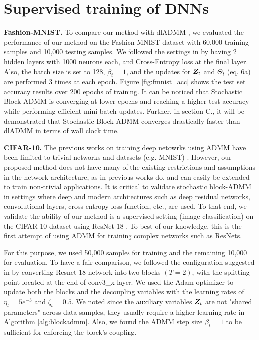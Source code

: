 \section{Supervised training of DNNs}\label{sec:sup_train}

\textbf{Fashion-MNIST.}
To compare our method with dlADMM \cite{wang2019admm}, we evaluated the performance of our method on the Fashion-MNIST dataset \cite{xiao2017/online} with 60,000 training samples and 10,000 testing samples. We followed the settings in \cite{wang2019admm} by having 2 hidden layers with 1000 neurons each, and Cross-Entropy loss at the final layer. Also, the batch size is set to 128, $\beta_t = 1$, and the updates for ${\bm{Z}}_t$ and $\Theta_t$ (eq. 6a) are performed 3 times at each epoch. Figure \ref{fig:fmnist_acc} shows the test set accuracy results over 200 epochs of training. It can be noticed that Stochastic Block ADMM is converging at lower epochs and reaching a higher test accuracy while performing efficient mini-batch updates. Further, in section C., it will be demonstrated that Stochastic Block ADMM converges drastically faster than dlADMM in terms of wall clock time.



\textbf{CIFAR-10.}
The previous works on training deep netowrks using ADMM have been limited to trivial networks and datasets (e.g. MNIST) \cite{taylor2016training,wang2019admm}. However, our proposed method does not have many of the existing restrictions and assumptions in the network architecture, as in previous works do, and can easily be extended to train non-trivial applications. It is critical to validate stochastic block-ADMM in settings where deep and modern architectures such as deep residual networks, convolutional layers, cross-entropy loss function, etc., are used. To that end, we validate the ability of our method is a supervised setting (image classification) on the CIFAR-10 dataset \cite{cifar} using ResNet-18 \cite{he2016deep}. To best of our knowledge, this is the first attempt of using ADMM for training complex networks such as ResNets. 


For this purpose, we used 50,000 samples for training and the remaining 10,000 for evaluation. 
To have a fair comparison, we followed the configuration suggested in \cite{gotmare2018decoupling} by converting Resnet-18 network into two blocks $(T=2)$, with the splitting point located at the end of {\sc conv3\_x} layer. We used the Adam optimizer to update both the blocks and the decoupling variables with the learning rates of $\eta_t = 5e^{-3}$ and $\zeta_t = 0.5$. We noted since the auxiliary variables ${\bm{Z}}_t$ are not "shared parameters" across data samples, they usually require a higher learning rate in Algorithm \ref{alg:blockadmm}. Also, we found the ADMM step size $\beta_t = 1$ to be sufficient for enforcing the block's coupling. 


